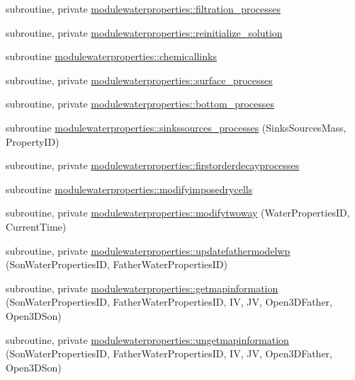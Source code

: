 \begin{DoxyCompactItemize}
\item 
subroutine, private \mbox{\hyperlink{namespacemodulewaterproperties_a58f066775e7df388495e6602c2d567e6}{modulewaterproperties\+::filtration\+\_\+processes}}
\item 
subroutine, private \mbox{\hyperlink{namespacemodulewaterproperties_a3b050fab4946fe3d8840f4104a85e0ab}{modulewaterproperties\+::reinitialize\+\_\+solution}}
\item 
subroutine \mbox{\hyperlink{namespacemodulewaterproperties_af5a9b4a5acf0da8a86fcabea8bf09f28}{modulewaterproperties\+::chemicallinks}}
\item 
subroutine, private \mbox{\hyperlink{namespacemodulewaterproperties_a3741d54f8b36c751fb10748ab34af465}{modulewaterproperties\+::surface\+\_\+processes}}
\item 
subroutine, private \mbox{\hyperlink{namespacemodulewaterproperties_aaba72b54a08a1561f8eff8fae60998f2}{modulewaterproperties\+::bottom\+\_\+processes}}
\item 
subroutine \mbox{\hyperlink{namespacemodulewaterproperties_a10d63582cfbe1d7e4a4c18ad2b27ffc5}{modulewaterproperties\+::sinkssources\+\_\+processes}} (Sinks\+Sources\+Mass, Property\+ID)
\item 
subroutine, private \mbox{\hyperlink{namespacemodulewaterproperties_a8e4fffcfd269b64a4795cf007ee2b707}{modulewaterproperties\+::firstorderdecayprocesses}}
\item 
subroutine \mbox{\hyperlink{namespacemodulewaterproperties_aaeed6e345543d58d8feee181656796d0}{modulewaterproperties\+::modifyimposedrycells}}
\item 
subroutine, private \mbox{\hyperlink{namespacemodulewaterproperties_aa39cc64df05076f8396e1894e6e74ad5}{modulewaterproperties\+::modifytwoway}} (Water\+Properties\+ID, Current\+Time)
\item 
subroutine, private \mbox{\hyperlink{namespacemodulewaterproperties_ad407a42c26969949261233d9d0aa8da1}{modulewaterproperties\+::updatefathermodelwp}} (Son\+Water\+Properties\+ID, Father\+Water\+Properties\+ID)
\item 
subroutine, private \mbox{\hyperlink{namespacemodulewaterproperties_a1b70dbb2ea91a797c991fcc031837095}{modulewaterproperties\+::getmapinformation}} (Son\+Water\+Properties\+ID, Father\+Water\+Properties\+ID, IV, JV, Open3\+D\+Father, Open3\+D\+Son)
\item 
subroutine, private \mbox{\hyperlink{namespacemodulewaterproperties_ab369effb692dc27866518b2a5fa9fe1b}{modulewaterproperties\+::ungetmapinformation}} (Son\+Water\+Properties\+ID, Father\+Water\+Properties\+ID, IV, JV, Open3\+D\+Father, Open3\+D\+Son)

\end{DoxyCompactItemize}

